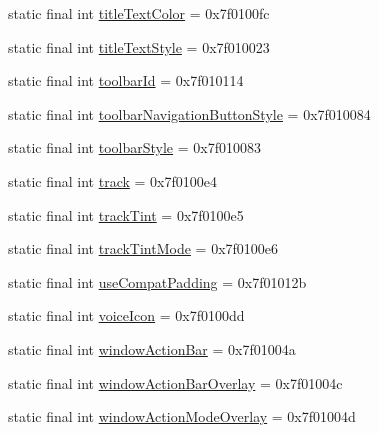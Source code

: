\begin{CompactItemize}
static final int \hyperlink{classandroid_1_1support_1_1graphics_1_1drawable_1_1_r_1_1attr_90d90341668f21bde482c39e687fa5a2}{titleTextColor} = 0x7f0100fc
\item 
static final int \hyperlink{classandroid_1_1support_1_1graphics_1_1drawable_1_1_r_1_1attr_a256795c7f8879fd01011ec56db3e0f3}{titleTextStyle} = 0x7f010023
\item 
static final int \hyperlink{classandroid_1_1support_1_1graphics_1_1drawable_1_1_r_1_1attr_6552aab8ccfd9eca38dfb147f4a0919e}{toolbarId} = 0x7f010114
\item 
static final int \hyperlink{classandroid_1_1support_1_1graphics_1_1drawable_1_1_r_1_1attr_e5baee99e50aee54ca21d2f97f470d17}{toolbarNavigationButtonStyle} = 0x7f010084
\item 
static final int \hyperlink{classandroid_1_1support_1_1graphics_1_1drawable_1_1_r_1_1attr_9b568116e22fd4225dcc42d7fdf3f156}{toolbarStyle} = 0x7f010083
\item 
static final int \hyperlink{classandroid_1_1support_1_1graphics_1_1drawable_1_1_r_1_1attr_05a2c97d3c78f9a10b495595ada05f95}{track} = 0x7f0100e4
\item 
static final int \hyperlink{classandroid_1_1support_1_1graphics_1_1drawable_1_1_r_1_1attr_83b9d14c57d6283602becfadf708b2d8}{trackTint} = 0x7f0100e5
\item 
static final int \hyperlink{classandroid_1_1support_1_1graphics_1_1drawable_1_1_r_1_1attr_76313f1b5989f46b0987a2e0b9df508b}{trackTintMode} = 0x7f0100e6
\item 
static final int \hyperlink{classandroid_1_1support_1_1graphics_1_1drawable_1_1_r_1_1attr_7f4e3ec8fb44c7785a68f87c664574b1}{useCompatPadding} = 0x7f01012b
\item 
static final int \hyperlink{classandroid_1_1support_1_1graphics_1_1drawable_1_1_r_1_1attr_5c0ecb3bfea1e3e28ae31646cb4f6655}{voiceIcon} = 0x7f0100dd
\item 
static final int \hyperlink{classandroid_1_1support_1_1graphics_1_1drawable_1_1_r_1_1attr_2b534d58e927dbf03030703f1c9edd56}{windowActionBar} = 0x7f01004a
\item 
static final int \hyperlink{classandroid_1_1support_1_1graphics_1_1drawable_1_1_r_1_1attr_0e37bfe4a2356be9deb3703b4577501c}{windowActionBarOverlay} = 0x7f01004c
\item 
static final int \hyperlink{classandroid_1_1support_1_1graphics_1_1drawable_1_1_r_1_1attr_191455c098f934dc4013ce3dfc2c6abf}{windowActionModeOverlay} = 0x7f01004d
\item 

\end{CompactItemize}
